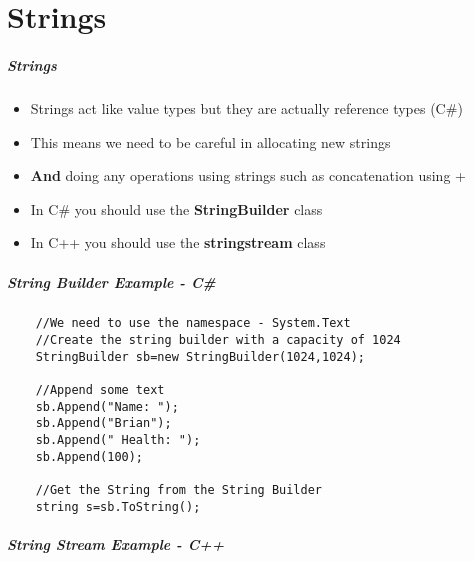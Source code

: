 \part{Strings}
\frame{\partpage}

\begin{frame}
\frametitle{Strings}
	\begin{itemize}
		\item Strings act like value types but they are actually reference types (C\#)
		\item This means we need to be careful in allocating new strings
		\item \textbf{And} doing any operations using strings such as concatenation using +
		\item In C\# you should use the \textbf{StringBuilder} class 
		\item In C++ you should use the \textbf{stringstream} class
	\end{itemize}
\end{frame}

\begin{frame}[fragile]
\frametitle{String Builder Example - C\#}
	\begin{lstlisting}
	//We need to use the namespace - System.Text
	//Create the string builder with a capacity of 1024
	StringBuilder sb=new StringBuilder(1024,1024);
	
	//Append some text
	sb.Append("Name: ");
	sb.Append("Brian");
	sb.Append(" Health: ");
	sb.Append(100);
	
	//Get the String from the String Builder
	string s=sb.ToString();
	\end{lstlisting}
\end{frame}

\begin{frame}[fragile]
\frametitle{String Stream Example - C++}
	\begin{lstlisting}
	\end{lstlisting}
\end{frame}